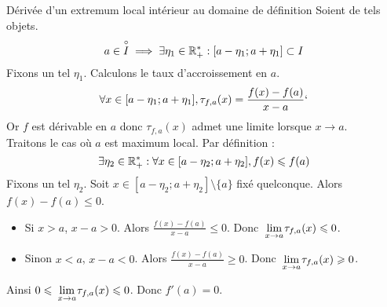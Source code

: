 \documentclass{article}
\begin{document}
\begin{question_kholle}
	[Soit $f : I \rightarrow \R$. Si $f$ admet un extremum local en $a \in \overset{\circ}{I}$ et si $f$ est dérivable en $a$, alors $f'(a) = 0$.
			{\begin{figure}[!h]
					\centering
					\tikzmath{ real \m; real \fm; \m = 5/3; \fm = 23/27; }
					\begin{tikzpicture}[scale=2]
						\draw[-stealth] (0,0) -- (3,0) node[anchor=west] {$x$};
						\draw[-stealth] (0,0) -- (0,2) node[anchor=south] {$y$};

						\draw[purple, thick, smooth, samples=200, domain=0.3:2.4]
						plot(\x, {1 + pow((\x-1),3) - pow((\x-1),2)});
						\draw[teal, dashed] (\m,\fm) -- (\m,0) node[anchor=north] {$m$};

						\draw[stealth-stealth, teal] (\m-0.8,\fm) -- (\m+0.8,\fm);
						\draw (\m,\fm) node[above=1em,teal] {$f'(m)=0$};
					\end{tikzpicture}
				\end{figure}}]
	{Dérivée d'un extremum local intérieur au domaine de définition}
	Soient de tels objets. \\
	$$a \in \overset{\circ}{I} \implies \exists \eta_1 \in \mathbb R_+^* : [a-\eta_1;a+\eta_1] \subset I$$
	Fixons un tel $\eta_1$.
	Calculons le taux d'accroissement en $a$.
	\begin{equation*}
		\forall x \in [a-\eta_1;a+\eta_1], \tau_{f,a}(x) = \frac{f(x) - f(a)}{x - a}`
	\end{equation*}
	Or $f$ est dérivable en $a$ donc $\tau_{f,a}(x)$ admet une limite lorsque $x \rightarrow a$.\\
	Traitons le cas où $a$ est maximum local. Par définition :
	\begin{equation*}
		\exists \eta_2 \in \mathbb R_+^* : \forall x \in [a-\eta_2;a+\eta_2], f(x) \leqslant f(a)
	\end{equation*}
	Fixons un tel $\eta_2$. Soit $x \in [a-\eta_2;a+\eta_2] \setminus \{a\}$ fixé quelconque.
	Alors $f(x) - f(a) \leqslant 0$. \\
	\begin{itemize}[label=$\bullet$]
		\item	Si $x > a$, $x - a > 0$. Alors $\frac{f(x) - f(a)}{x - a} \leqslant 0$. Donc $\lim\limits_{\;x \to a\;}\!\! \tau_{f,a}(x) \leqslant 0$. \\
		\item Sinon $x < a$, $x - a < 0$. Alors $\frac{f(x) - f(a)}{x - a} \geqslant 0$. Donc $\lim\limits_{\;x \to a\;}\!\! \tau_{f,a}(x) \geqslant 0$. \\
	\end{itemize}
	Ainsi $0 \leqslant \lim\limits_{\;x \to a\;}\!\! \tau_{f,a}(x) \leqslant 0$. Donc $f'(a) = 0$.
\end{question_kholle}
\end{document}
